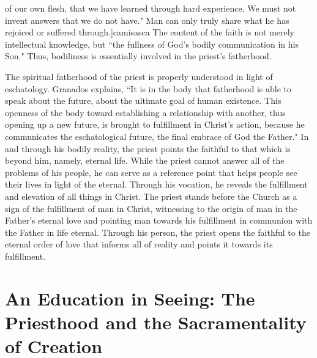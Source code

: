 \documentclass[twoside,10pt]{article}
\begin{document}
of our own flesh, that we have learned through hard experience. We must not invent answers that we do not have." Man can only truly share what he has rejoiced or suffered through.]{camisasca} The content of the faith is not merely intellectual knowledge, but ``the fullness of God’s bodily communication in his Son."\autocite[214]{granados} Thus, bodiliness is essentially involved in the priest’s fatherhood.

The spiritual fatherhood of the priest is properly understood in light of eschatology. Granados explains, ``It is in the body that fatherhood is able to speak about the future, about the ultimate goal of human existence. This openness of the body toward establishing a relationship with another, thus opening up a new future, is brought to fulfillment in Christ’s action, because he communicates the eschatological future, the final embrace of God the Father."\autocite[204]{granados} In and through his bodily reality, the priest points the faithful to that which is beyond him, namely, eternal life. While the priest cannot answer all of the problems of his people, he can serve as a reference point that helps people see their lives in light of the eternal. Through his vocation, he reveals the fulfillment and elevation of all things in Christ. The priest stands before the Church as a sign of the fulfillment of man in Christ, witnessing to the origin of man in the Father’s eternal love and pointing man towards his fulfillment in communion with the Father in life eternal. Through his person, the priest opens the faithful to the eternal order of love that informs all of reality and points it towards its fulfillment. 



\section{An Education in Seeing: The Priesthood and the Sacramentality of Creation}
\end{document}
